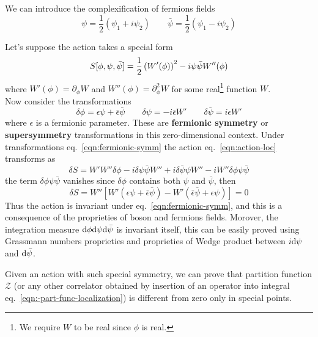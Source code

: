 \documentclass[../main/main.tex]{subfiles}
\begin{document}
We can introduce the complexification of fermions fields
\[\psi=\frac12(\psi_1+i\psi_2)\qquad\bar\psi=\frac12(\psi_1-i\psi_2)\]

Let's suppose the action takes a special form
\begin{equation}\label{eqn:action-loc}
S[\phi,\psi,\bar\psi]=\frac12\left(W'(\phi)\right)^2-i\psi\bar\psi W''(\phi)
\end{equation}
where $W'(\phi)=\partial_\phi W$ and $W''(\phi)=\partial^2_\phi W$ for some real\footnote{We require $W$ to be real since $\phi$ is real.} function $W$. \\
Now consider the transformations
\begin{equation}\label{eqn:fermionic-symm}
\delta\phi=\epsilon\psi+\bar\epsilon\bar\psi\qquad\delta\psi=-i\bar\epsilon W'\qquad\delta\bar\psi=i\epsilon W'
\end{equation}
where $\epsilon$ is a fermionic parameter. These are \textbf{fermionic symmetry} or \textbf{supersymmetry} transformations in this zero-dimensional context. Under transformations eq.~\eqref{eqn:fermionic-symm} the action eq.~\eqref{eqn:action-loc} transforms as
\[\delta S=W'W''\delta\phi-i\delta\psi\bar\psi W''+i\delta\bar\psi\psi W''-iW''\delta\phi\psi\bar\psi\]
the term $\delta\phi\psi\bar\psi$ vanishes since $\delta\phi$ contains both $\psi$ and $\bar\psi$, then
\[\delta S=W''[W'(\epsilon\psi+\bar\epsilon\bar\psi)-W'(\bar\epsilon\bar\psi+\epsilon\psi)]=0\]
Thus the action is invariant under eq.~\eqref{eqn:fermionic-symm}, and this is a consequence of the proprieties of boson and fermions fields. 
Morover, the integration measure $\textup{d}\phi\textup{d}\psi\textup{d}\bar\psi$ is invariant itself, this can be easily proved using Grassmann numbers proprieties and proprieties of Wedge product between $i\textup{d}\psi$ and $\textup{d}\bar\psi$. 

Given an action with such special symmetry, we can prove that partition function $\mathcal Z$ (or any other correlator obtained by insertion of an operator into integral eq.~\eqref{eqn:-part-func-localization}) is different from zero only in special points.
\end{document}
